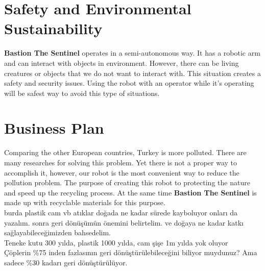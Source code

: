 \documentclass[12pt,a4paper]{article}
\begin{document}
  
 \section{Safety and Environmental Sustainability}
  \begin{flushleft}
   \textbf{Bastion The Sentinel} operates in a semi-autonomous way. It has a robotic arm and can interact 
   with objects in environment. However, there can be living creatures or objects that we do not want to 
   interact with. This situation creates a safety and security issues. Using the robot with an operator 
   while it's operating will be safest way to avoid this type of situations. 
  \end{flushleft}

 \section{Business Plan}
 \begin{flushleft}
  Comparing the other European countries, Turkey is more polluted. There are many researches for solving 
  this problem. Yet there is not a proper way to accomplish it, however, our robot is the most convenient 
  way to reduce the pollution problem. The purpose of creating this robot to protecting the nature and 
  speed up the recycling process. At the same time \textbf{Bastion The Sentinel} is made up with recyclable 
  materials for this purpose.\\
  \bigskip
  burda plastik cam vb atıklar doğada ne kadar sürede kayboluyor onları da yazalım. sonra geri dönüşümün 
  önemini belirtelim. ve doğaya ne kadar katkı sağlayabileceğimizden bahsedelim.\\
  \bigskip
  Teneke kutu 300 yılda, plastik 1000 yılda, cam şişe 1m yılda yok oluyor\\
  Çöplerin \%75 inden fazlasının geri dönüştürülebileceğini biliyor muydunuz? Ama sadece \%30 kadarı geri dönüştürülüyor.
 \end{flushleft}
\end{document}

